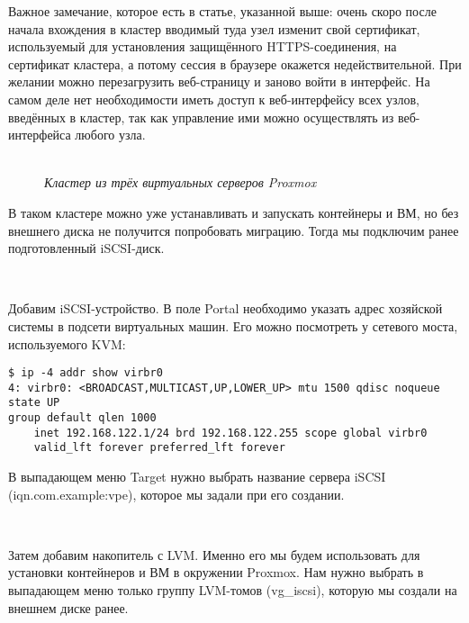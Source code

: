 \documentclass[14pt, a4paper]{article}
\begin{document}
Важное замечание, которое есть в статье, указанной выше: очень скоро после начала вхождения в
кластер вводимый туда узел изменит свой сертификат, используемый для установления защищённого
HTTPS-соединения, на сертификат кластера, а потому сессия в браузере окажется недействительной.
При желании можно перезагрузить веб-страницу и заново войти в интерфейс. На самом деле нет
необходимости иметь доступ к веб-интерфейсу всех узлов, введённых в кластер, так как управление
ими можно осуществлять из веб-интерфейса любого узла.\\

\newpage

\begin{figure}[h]
    \centering
    \\
    \small\textit{Кластер из трёх виртуальных серверов Proxmox}  
    \label{framework} 
\end{figure}

В таком кластере можно уже устанавливать и запускать контейнеры и ВМ, но без внешнего диска не
получится попробовать миграцию. Тогда мы подключим ранее подготовленный iSCSI-диск.

\begin{figure}[h]
    \centering
    \\
    \label{framework} 
\end{figure}

Добавим iSCSI-устройство. В поле Portal необходимо указать адрес хозяйской системы в подсети
виртуальных машин. Его можно посмотреть у сетевого моста, используемого KVM:

\begin{lstlisting}
$ ip -4 addr show virbr0
4: virbr0: <BROADCAST,MULTICAST,UP,LOWER_UP> mtu 1500 qdisc noqueue state UP
group default qlen 1000
    inet 192.168.122.1/24 brd 192.168.122.255 scope global virbr0
    valid_lft forever preferred_lft forever
\end{lstlisting}

В выпадающем меню Target нужно выбрать название сервера iSCSI (iqn.com.example:vpe), которое мы
задали при его создании.

\begin{figure}[h]
    \centering
    \\
    \label{framework} 
\end{figure}

Затем добавим накопитель с LVM. Именно его мы будем использовать для установки контейнеров и
ВМ в окружении Proxmox. Нам нужно выбрать в выпадающем меню только группу LVM-томов
(vg\_iscsi), которую мы создали на внешнем диске ранее.
\end{document}
